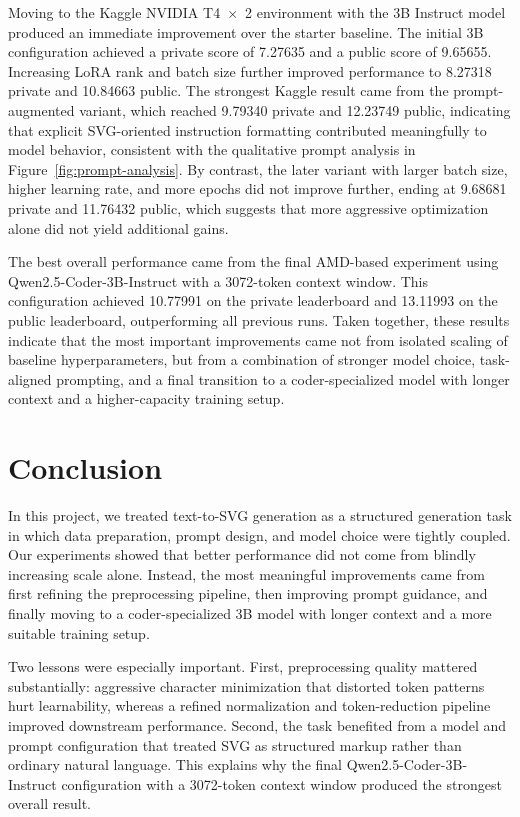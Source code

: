 \documentclass[11pt]{article}
\begin{document}
Moving to the Kaggle NVIDIA T4~$\times$~2 environment with the 3B Instruct
model produced an immediate improvement over the starter baseline. The initial
3B configuration achieved a private score of 7.27635 and a public score of
9.65655. Increasing LoRA rank and batch size further improved performance to
8.27318 private and 10.84663 public. The strongest Kaggle result came from the
prompt-augmented variant, which reached 9.79340 private and 12.23749 public,
indicating that explicit SVG-oriented instruction formatting contributed
meaningfully to model behavior, consistent with the qualitative prompt
analysis in Figure~\ref{fig:prompt-analysis}. By contrast, the later variant
with larger
batch size, higher learning rate, and more epochs did not improve further,
ending at 9.68681 private and 11.76432 public, which suggests that more
aggressive optimization alone did not yield additional gains.

The best overall performance came from the final AMD-based experiment using
Qwen2.5-Coder-3B-Instruct with a 3072-token context window. This configuration
achieved 10.77991 on the private leaderboard and 13.11993 on the public
leaderboard, outperforming all previous runs. Taken together, these results
indicate that the most important improvements came not from isolated scaling
of baseline hyperparameters, but from a combination of stronger model choice,
task-aligned prompting, and a final transition to a coder-specialized model
with longer context and a higher-capacity training setup.

\section{Conclusion}

In this project, we treated text-to-SVG generation as a structured generation
task in which data preparation, prompt design, and model choice were tightly
coupled. Our experiments showed that better performance did not come from
blindly increasing scale alone. Instead, the most meaningful improvements came
from first refining the preprocessing pipeline, then improving prompt
guidance, and finally moving to a coder-specialized 3B model with longer
context and a more suitable training setup.

Two lessons were especially important. First, preprocessing quality mattered
substantially: aggressive character minimization that distorted token patterns
hurt learnability, whereas a refined normalization and token-reduction
pipeline improved downstream performance. Second, the task benefited from a
model and prompt configuration that treated SVG as structured markup rather
than ordinary natural language. This explains why the final
Qwen2.5-Coder-3B-Instruct configuration with a 3072-token context window
produced the strongest overall result.
\end{document}
